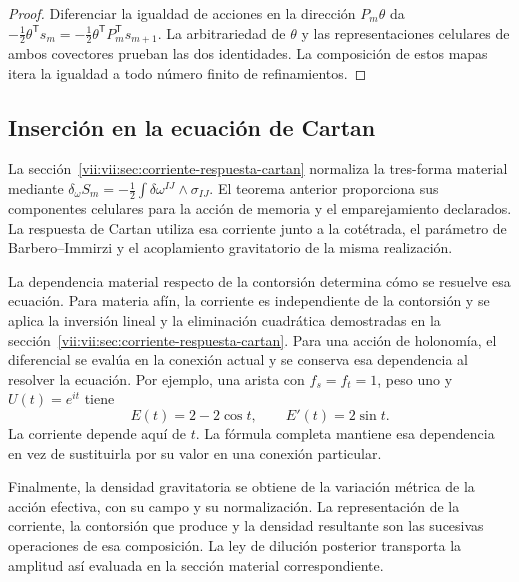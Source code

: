 \begin{proof}
Diferenciar la igualdad de acciones en la dirección
\(P_m\theta\) da
\(-\tfrac12\theta^{\mathsf T}s_m
 =-\tfrac12\theta^{\mathsf T}P_m^{\mathsf T}s_{m+1}\).
La arbitrariedad de \(\theta\) y las representaciones celulares
de ambos covectores prueban las dos identidades. La composición de
estos mapas itera la igualdad a todo número finito de refinamientos.
\end{proof}

\subsection{Inserción en la ecuación de Cartan}

La sección~\ref{vii:vii:sec:corriente-respuesta-cartan} normaliza la
tres-forma material mediante
\(\delta_\omega S_m=-\tfrac12\int\delta\omega^{IJ}\wedge
\sigma_{IJ}\). El teorema anterior proporciona sus componentes
celulares para la acción de memoria y el emparejamiento declarados.
La respuesta de Cartan utiliza esa corriente junto a la cotétrada,
el parámetro de Barbero--Immirzi y el acoplamiento gravitatorio de la
misma realización.

La dependencia material respecto de la contorsión determina cómo se
resuelve esa ecuación. Para materia afín, la corriente es independiente
de la contorsión y se aplica la inversión lineal y la eliminación
cuadrática demostradas en la sección~\ref{vii:vii:sec:corriente-respuesta-cartan}.
Para una acción de
holonomía, el diferencial se evalúa en la conexión actual y se conserva
esa dependencia al resolver la ecuación. Por ejemplo, una arista con
\(f_s=f_t=1\), peso uno y \(U(t)=e^{it}\) tiene
\[
 E(t)=2-2\cos t,\qquad E'(t)=2\sin t.
\]
La corriente depende aquí de \(t\). La fórmula completa mantiene
esa dependencia en vez de sustituirla por su valor en una conexión
particular.

Finalmente, la densidad gravitatoria se obtiene de la variación
métrica de la acción efectiva, con su campo y su normalización.
La representación de la corriente, la contorsión que produce y la
densidad resultante son las sucesivas operaciones de esa composición.
La ley de dilución posterior transporta la amplitud así evaluada en
la sección material correspondiente.
